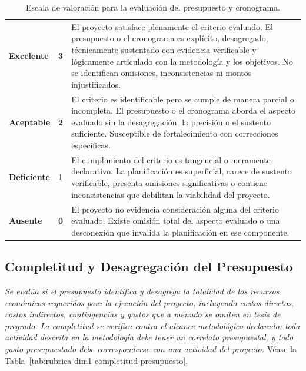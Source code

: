 \begin{table}[htbp]
\centering
\scriptsize
\caption{Escala de valoración para la evaluación del presupuesto y cronograma.}
\label{tab:escala-presupuesto-cronograma}
\begin{tabularx}{\textwidth}{|C{1.8cm}|C{.6cm}|X|}
\hline
{}
 &  &  \\ \hline
\textcolor{csuf}{\textbf{Excelente}} & \textbf{3} & El proyecto satisface plenamente el criterio evaluado. El presupuesto o el cronograma es explícito, desagregado, técnicamente sustentado con evidencia verificable y lógicamente articulado con la metodología y los objetivos. No se identifican omisiones, inconsistencias ni montos injustificados. \\ \hline
{}
\textcolor{cace}{\textbf{Aceptable}} & \textbf{2} & El criterio es identificable pero se cumple de manera parcial o incompleta. El presupuesto o el cronograma aborda el aspecto evaluado sin la desagregación, la precisión o el sustento suficiente. Susceptible de fortalecimiento con correcciones específicas. \\ \hline
\textcolor{cdef}{\textbf{Deficiente}} & \textbf{1} & El cumplimiento del criterio es tangencial o meramente declarativo. La planificación es superficial, carece de sustento verificable, presenta omisiones significativas o contiene inconsistencias que debilitan la viabilidad del proyecto. \\ \hline
{}
\textcolor{cins}{\textbf{Ausente}} & \textbf{0} & El proyecto no evidencia consideración alguna del criterio evaluado. Existe omisión total del aspecto evaluado o una desconexión que invalida la planificación en ese componente. \\ \hline
\end{tabularx}
\end{table}

\clearpage
\subsection{Completitud y Desagregación del Presupuesto}

\textit{Se evalúa si el presupuesto identifica y desagrega la totalidad de los recursos económicos requeridos para la ejecución del proyecto, incluyendo costos directos, costos indirectos, contingencias y gastos que a menudo se omiten en tesis de pregrado. La completitud se verifica contra el alcance metodológico declarado: toda actividad descrita en la metodología debe tener un correlato presupuestal, y todo gasto presupuestado debe corresponderse con una actividad del proyecto.} Véase la Tabla~\ref{tab:rubrica-dim1-completitud-presupuesto}.

